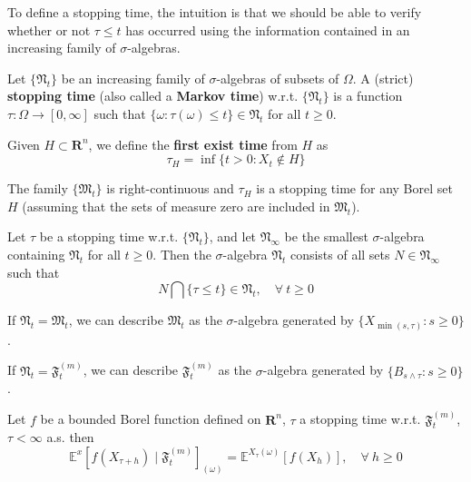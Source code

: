 To define a stopping time, the intuition is that we should be able to verify whether or not $\tau \leq t$ has occurred using the information contained in an increasing family of $\sigma$-algebras. 

\begin{definition}
    Let $\{ \mathfrak{N}_t \}$ be an increasing family of $\sigma$-algebras of subsets of $\Omega$. A (strict) \textbf{stopping time} (also called a \textbf{Markov time}) w.r.t. $\{ \mathfrak{N}_t \}$ is a function $\tau : \Omega \longrightarrow [0, \infty]$ such that $\{ \omega : \tau(\omega) \leq t \} \in \mathfrak{N}_t$ for all $t \geq 0$.
\end{definition}

\begin{definition}
    Given $H \subset \textbf{R}^n$, we define the \textbf{first exist time} from $H$ as 
    \[
        \tau_H = \inf \{ t > 0 : X_t \notin H \}
    \]
\end{definition}

\begin{remark}
    The family $\{ \mathfrak{M}_t \}$ is right-continuous and $\tau_H$ is a stopping time for any Borel set $H$ (assuming that the sets of measure zero are included in $\mathfrak{M}_t$).
\end{remark}

\begin{definition}
    Let $\tau$ be a stopping time w.r.t. $\{ \mathfrak{N}_t \}$, and let $\mathfrak{N}_\infty$ be the smallest $\sigma$-algebra containing $\mathfrak{N}_t$ for all $t \geq 0$. Then the $\sigma$-algebra $\mathfrak{N}_t$ consists of all sets $N \in \mathfrak{N}_\infty$ such that 
    \[
        N \bigcap \{ \tau \leq t \} \in \mathfrak{N}_t, \quad \forall ~t\geq 0
    \]
\end{definition}

\begin{remark}
    If $\mathfrak{N}_t = \mathfrak{M}_t$, we can describe $\mathfrak{M}_t$ as the $\sigma$-algebra generated by $\{ X_{\min(s, \tau)} : s \geq 0 \}$.

    If $\mathfrak{N}_t = \mathfrak{F}_t^{(m)}$, we can describe $\mathfrak{F}_t^{(m)}$ as the $\sigma$-algebra generated by $\{ B_{s \wedge \tau} : s \geq 0 \}$.
\end{remark}

\begin{theorem}
    Let $f$ be a bounded Borel function defined on $\textbf{R}^n$, $\tau$ a stopping time w.r.t. $\mathfrak{F}_t^{(m)}$, $\tau < \infty$ a.s. then 
    \begin{equation}\label{eq:str_markov_property}
        \mathbb{E}^x [f(X_{\tau+h}) \mid \mathfrak{F}_t^{(m)}]_{(\omega)} = \mathbb{E}^{X_\tau(\omega)} [f(X_h)], \quad \forall ~h \geq 0
    \end{equation}
\end{theorem}

